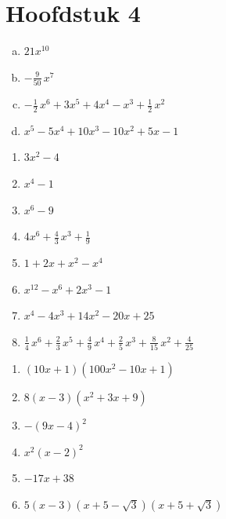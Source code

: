 \documentclass{ximera}
\begin{document}
\section*{Hoofdstuk 4}

\begin{oplossing} 
\begin{enumerate}[(a)]
\item
\hyperlink{oef4.1}{$21x^{10}$}
\item
\hyperlink{oef4.1}{$-\frac{9}{50}\,x^7$}
\item
\hyperlink{oef4.1}{$-\frac{1}{2}\,x^6 + 3x^5 + 4x^4 - x^3 + \frac{1}{2}\,x^2$}
\item
\hyperlink{oef4.1}{$x^5 - 5x^4 + 10x^3 - 10x^2 + 5x - 1$}
\end{enumerate}
\end{oplossing} 

\begin{oplossing} 
\begin{enumerate}
\item
\hyperlink{oef4.2}{$3x^2 - 4$}
\item
\hyperlink{oef4.2}{$x^4-1$}
\item
\hyperlink{oef4.2}{$x^6-9$}
\item
\hyperlink{oef4.2}{$4x^6 + \frac{4}{3}\,x^3+\frac{1}{9}$}
\item
\hyperlink{oef4.2}{$1 + 2x + x^2 - x^4$}
\item
\hyperlink{oef4.2}{$x^{12}-x^6+2x^3 - 1$}
\item
\hyperlink{oef4.2}{$x^4 - 4x^3 + 14x^2 - 20x + 25$}
\item
\hyperlink{oef4.2}{$\frac{1}{4}\,x^6 + \frac{2}{3}\,x^5 + \frac{4}{9}\,x^4 + \frac{2}{5}\,x^3 + \frac{8}{15}\,x^2 + \frac{4}{25}$}
\end{enumerate}
\end{oplossing} 

\begin{oplossing} 
\begin{enumerate}
\item
\hyperlink{oef4.3}{$(10x+1)(100x^2 - 10x + 1)$}
\item
\hyperlink{oef4.3}{$8(x-3)(x^2 + 3x + 9)$}
\item
\hyperlink{oef4.3}{$-(9x-4)^2$}
\item
\hyperlink{oef4.3}{$x^2(x-2)^2$}
\item
\hyperlink{oef4.3}{$-17x+38$}
\item
\hyperlink{oef4.3}{$5(x-3)(x+5-\sqrt{3})(x+5+\sqrt{3})$}
\end{enumerate}
\end{oplossing} 
\end{document}
